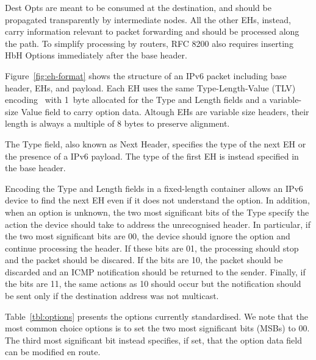 \documentclass[conference]{IEEEtran}
\begin{document}
Dest Opts are meant to be consumed at the destination, and should be propagated
transparently by intermediate nodes. All the other EHs, instead, carry
information relevant to packet forwarding and should be processed along the
path. To simplify processing by routers, RFC 8200 also requires inserting HbH
Options immediately after the base header.

Figure~\ref{fig:eh-format} shows the structure of an IPv6 packet including base
header, EHs, and payload.  Each EH uses the same Type-Length-Value (TLV)
encoding~\cite{RFC8200} with 1~byte allocated for the Type and Length fields
and a variable-size Value field to carry option data. Altough EHs are variable
size headers, their length is always a multiple of 8 bytes to preserve
alignment. 

The Type field, also known as Next Header, specifies the type of the next
EH or the presence of a IPv6 payload. The type of the first EH
is instead specified in the base header.

Encoding the Type and Length fields in a fixed-length container allows an IPv6
device to find the next EH even if it does not understand the option. In
addition, when an option is unknown, the two most significant bits of the Type
specify the action the device should take to address the unrecognised header.
In particular, if the two most significant bits are 00, the device should
ignore the option and continue processing the header. If these bits are 01, the
processing should stop and the packet should be discared. If the bits are 10,
the packet should be discarded and an ICMP notification should be returned to
the sender. Finally, if the bits are 11, the same actions as 10 should occur
but the notification should be sent only if the destination address was not
multicast. 

Table~\ref{tbl:options} presents the options currently standardised.  We note
that the most common choice options is to set the two most significant bits
(MSBs) to 00.  The third most significant bit instead specifies, if set, 
that the option data field can be modified en route.

\end{document}
